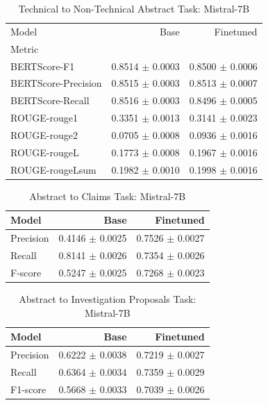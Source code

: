 \documentclass[11pt]{article}
\begin{document}
\begin{table}[H]
\centering
{\small
\begin{tabular}{lrr}
\toprule
Model & Base & Finetuned \\
Metric & & \\
\midrule
BERTScore-F1         & 0.8514 $\pm$ 0.0003 & 0.8500 $\pm$ 0.0006 \\
BERTScore-Precision  & 0.8515 $\pm$ 0.0003 & 0.8513 $\pm$ 0.0007 \\
BERTScore-Recall     & 0.8516 $\pm$ 0.0003 & 0.8496 $\pm$ 0.0005 \\
ROUGE-rouge1         & 0.3351 $\pm$ 0.0013 & 0.3141 $\pm$ 0.0023 \\
ROUGE-rouge2         & 0.0705 $\pm$ 0.0008 & 0.0936 $\pm$ 0.0016 \\
ROUGE-rougeL         & 0.1773 $\pm$ 0.0008 & 0.1967 $\pm$ 0.0016 \\
ROUGE-rougeLsum      & 0.1982 $\pm$ 0.0010 & 0.1998 $\pm$ 0.0016 \\
\bottomrule
\end{tabular}
}
\caption{Technical to Non-Technical Abstract Task: Mistral-7B}
\label{tab:tech2nontech}
\end{table}

\begin{table}[H]
\centering
{\small
\begin{tabular}{lrr}
\toprule
Model & Base & Finetuned \\
\midrule
Precision & 0.4146 $\pm$ 0.0025 & 0.7526 $\pm$ 0.0027 \\
Recall    & 0.8141 $\pm$ 0.0026 & 0.7354 $\pm$ 0.0026 \\
F-score   & 0.5247 $\pm$ 0.0025 & 0.7268 $\pm$ 0.0023 \\
\bottomrule
\end{tabular}
}
\caption{Abstract to Claims Task: Mistral-7B}
\label{tab:text2claims}
\end{table}

\begin{table}[H]
\centering
{\small
\begin{tabular}{lrr}
\toprule
Model & Base & Finetuned \\
\midrule
Precision & 0.6222 $\pm$ 0.0038 & 0.7219 $\pm$ 0.0027 \\
Recall    & 0.6364 $\pm$ 0.0034 & 0.7359 $\pm$ 0.0029 \\
F1-score  & 0.5668 $\pm$ 0.0033 & 0.7039 $\pm$ 0.0026 \\
\bottomrule
\end{tabular}
}
\caption{Abstract to Investigation Proposals Task: Mistral-7B}
\label{tab:text2ip}
\end{table}
\end{document}
